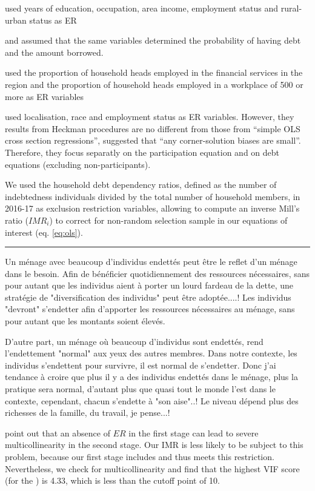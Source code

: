 \documentclass[a4paper, 11pt, onecolumn]{article}
\begin{document}
\cite{Cox1993} used years of education, occupation, area income, employment status and rural-urban status as ER

\cite{Duca1993} and \cite{Crook2001} assumed that the same variables determined the probability of having debt and the amount borrowed.

\cite{Bertaut2002} used the proportion of household heads employed in the financial services in the region and the proportion of household heads employed in a workplace of 500 or more as ER variables  

\cite{Rio2006} used localisation, race and employment status as ER variables.
However, they results from Heckman procedures are no different from those from ``simple OLS cross section regressions'', suggested that ``any corner-solution biases are small''.
Therefore, they focus separatly on the participation equation and on debt equations (excluding non-participants).


We used the household debt dependency ratios, defined as the number of indebtedness individuals divided by the total number of household members, in 2016-17 as exclusion restriction variables, allowing to compute an inverse Mill’s ratio ($IMR_{i}$) to correct for non-random selection sample in our equations of interest (eq. \ref{eq:ols}).
\par\noindent\rule{\textwidth}{0.4pt}
Un ménage avec beaucoup d'individus endettés peut être le reflet d'un ménage dans le besoin.
Afin de bénéficier quotidiennement des ressources nécessaires, sans pour autant que les individus aient à porter un lourd fardeau de la dette, une stratégie de "diversification des individus" peut être adoptée....!
Les individus "devront" s'endetter afin d'apporter les ressources nécessaires au ménage, sans pour autant que les montants soient élevés.

D'autre part, un ménage où beaucoup d'individus sont endettés, rend l'endettement "normal" aux yeux des autres membres.
Dans notre contexte, les individus s'endettent pour survivre, il est normal de s'endetter.
Donc j'ai tendance à croire que plus il y a des individus endettés dans le ménage, plus la pratique sera normal, d'autant plus que quasi tout le monde l'est dans le contexte, cependant, chacun s'endette à "son aise"..!
Le niveau dépend plus des richesses de la famille, du travail, je pense...!

\cite{Lennox2011} point out that an absence of $ER$ in the first stage can lead to severe multicollinearity in the second stage.
Our IMR is less likely to be subject to this problem, because our first stage includes  and thus meets this restriction.
Nevertheless, we check for multicollinearity and find that the highest VIF score (for the ) is 4.33, which is less than the cutoff point of 10.
\end{document}
